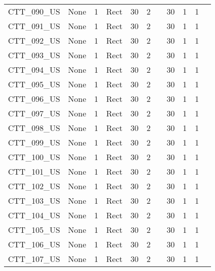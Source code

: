 \begin{table}[]
\begin{tabular}{@{}lcccccccccc@{}}
CTT\_090\_US  & None       & 1        & Rect & 30     & 2     &          & 30     & 1         & 1          \\
CTT\_091\_US  & None       & 1        & Rect & 30     & 2     &          & 30     & 1         & 1          \\
CTT\_092\_US  & None       & 1        & Rect & 30     & 2     &          & 30     & 1         & 1          \\
CTT\_093\_US  & None       & 1        & Rect & 30     & 2     &          & 30     & 1         & 1          \\
CTT\_094\_US  & None       & 1        & Rect & 30     & 2     &          & 30     & 1         & 1          \\
CTT\_095\_US  & None       & 1        & Rect & 30     & 2     &          & 30     & 1         & 1          \\
CTT\_096\_US  & None       & 1        & Rect & 30     & 2     &          & 30     & 1         & 1          \\
CTT\_097\_US  & None       & 1        & Rect & 30     & 2     &          & 30     & 1         & 1          \\
CTT\_098\_US  & None       & 1        & Rect & 30     & 2     &          & 30     & 1         & 1          \\
CTT\_099\_US  & None       & 1        & Rect & 30     & 2     &          & 30     & 1         & 1          \\
CTT\_100\_US  & None       & 1        & Rect & 30     & 2     &          & 30     & 1         & 1          \\
CTT\_101\_US  & None       & 1        & Rect & 30     & 2     &          & 30     & 1         & 1          \\
CTT\_102\_US  & None       & 1        & Rect & 30     & 2     &          & 30     & 1         & 1          \\
CTT\_103\_US  & None       & 1        & Rect & 30     & 2     &          & 30     & 1         & 1          \\
CTT\_104\_US  & None       & 1        & Rect & 30     & 2     &          & 30     & 1         & 1          \\
CTT\_105\_US  & None       & 1        & Rect & 30     & 2     &          & 30     & 1         & 1          \\
CTT\_106\_US  & None       & 1        & Rect & 30     & 2     &          & 30     & 1         & 1          \\
CTT\_107\_US  & None       & 1        & Rect & 30     & 2     &          & 30     & 1         & 1          \\

\end{tabular}
\end{table}

